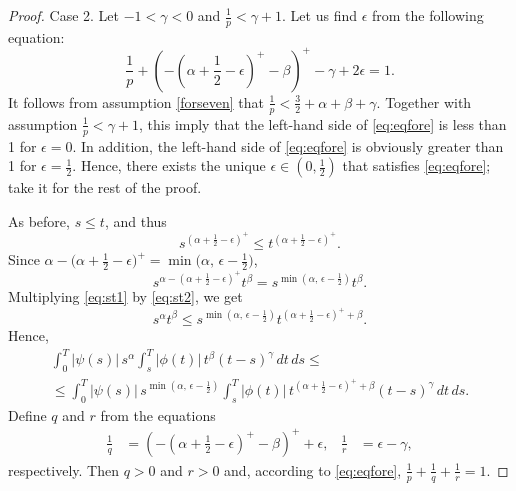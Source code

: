 \documentclass{article}
\theoremstyle{plain}
\theoremstyle{remark}
\theoremstyle{definition}
\begin{document}
\begin{proof}
	 Case 2. Let $-1 < \gamma < 0$ and
$\frac{1}{p} < \gamma+1$.
	Let us find $\epsilon$ from the following equation:
	\begin{equation}
		\label{eq:eqfore}
		\frac{1}{p}
		+ \left( - \left( \alpha + {\textstyle\frac12} - \epsilon\right)^+
		  - \beta\right)^+
		- \gamma + 2\epsilon = 1 .
	\end{equation}
	It follows from assumption \eqref{forseven} that
	$\frac{1}{p} < \frac32 + \alpha + \beta + \gamma$.
  Together with assumption $\frac{1}{p} <
\gamma + 1$, this imply that
	the left-hand side of \eqref{eq:eqfore}
	is less than 1 for $\epsilon=0$. In addition, the left-hand side of \eqref{eq:eqfore}  is obviously     greater than 1 for $\epsilon=\frac12$.
	Hence, there exists the unique $\epsilon\in(0,\frac12)$ that satisfies
	\eqref{eq:eqfore}; take it for the rest of the proof.

	As before,
	$s\mathbin{\le}t$, and thus
	\begin{equation}\label{eq:st1}
		s^{\left(\alpha+\frac12-\epsilon\right)^+} \le
		t^{\left(\alpha+\frac12-\epsilon\right)^+}.
	\end{equation}
	Since $\alpha - \bigl(\alpha+\frac12-\epsilon\bigr)^+ = \min\bigl(\alpha,\, \epsilon-\frac12\bigr)$,
	\begin{equation}\label{eq:st2}
		s^{\alpha - \left(\alpha+\frac12-\epsilon\right)^+}  t^\beta =
		s^{\min\left(\alpha,\, \epsilon-\frac12\right)} t^\beta.
	\end{equation}
	Multiplying \eqref{eq:st1} by \eqref{eq:st2}, we get
	\[
		s^\alpha t^\beta \le
		s^{\min\left(\alpha,\, \epsilon-\frac12\right)}
		t^{\left(\alpha+\frac12-\epsilon\right)^+ + \beta}.
	\]
	Hence,
	\begin{multline*}
		\int_0^T |\psi(s)|\, s^\alpha
		\int_s^T |\phi(t)|\, t^\beta (t-s)^\gamma
		\, dt \, ds
		\le \\ \le
		\int_0^T |\psi(s)|\,
		s^{\min\left(\alpha,\, \epsilon-\frac12\right)}
		\int_s^T |\phi(t)|\,
		t^{\left(\alpha+\frac12-\epsilon\right)^+ + \beta}
		(t-s)^\gamma
		\, dt \, ds .
	\end{multline*}
	Define $q$ and $r$ from the equations
	\begin{align*}
		\frac{1}{q} &=
		\left( - \left( \alpha + {\textstyle\frac12} - \epsilon\right)^+
		- \beta\right)^+ + \epsilon, &
		\frac{1}{r} &= \epsilon - \gamma,
	\end{align*}
respectively.
	Then $q>0$ and $r>0$ and, according to \eqref{eq:eqfore},
	$\frac{1}{p}+\frac{1}{q}+\frac{1}{r} = 1$.


\end{proof}
\end{document}
